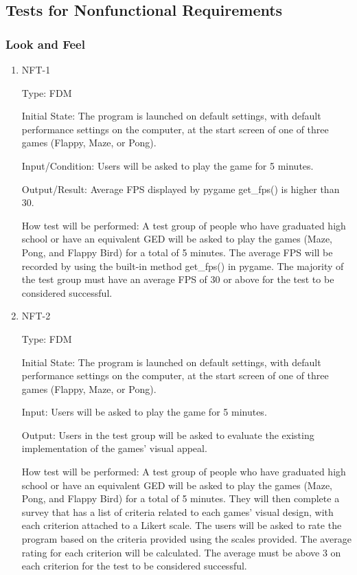 \documentclass[12pt, titlepage]{article}
\begin{document}
\subsection{Tests for Nonfunctional Requirements}

\subsubsection{Look and Feel}
	
\begin{enumerate}

\item{NFT-1\\}

Type: FDM
					
Initial State: The program is launched on default settings, with default performance settings on the computer, at the start screen of one of three games (Flappy, Maze, or Pong).
					
Input/Condition: Users will be asked to play the game for 5 minutes.
					
Output/Result: Average FPS displayed by pygame get\_fps() is higher than 30.
					
How test will be performed: A test group of people who have graduated high school or have an equivalent GED will be asked to play the games (Maze, Pong, and Flappy Bird) for a total of 5 minutes. The average FPS will be recorded by using the built-in method get\_fps() in pygame. The majority of the test group must have an average FPS of 30 or above for the test to be considered successful.
					
\item{NFT-2\\}

Type: FDM
					
Initial State: The program is launched on default settings, with default performance settings on the computer, at the start screen of one of three games (Flappy, Maze, or Pong).
					
Input: Users will be asked to play the game for 5 minutes.
					
Output: Users in the test group will be asked to evaluate the existing implementation of the games' visual appeal.
					
How test will be performed: A test group of people who have graduated high school or have an equivalent GED will be asked to play the games (Maze, Pong, and Flappy Bird) for a total of 5 minutes. They will then complete a survey that has a list of criteria related to each games' visual design, with each criterion attached to a Likert scale. The users will be asked to rate the program based on the criteria provided using the scales provided.  The average rating for each criterion will be calculated. The average must be above 3 on each criterion for the test to be considered successful. 

					

\end{enumerate}
\end{document}

